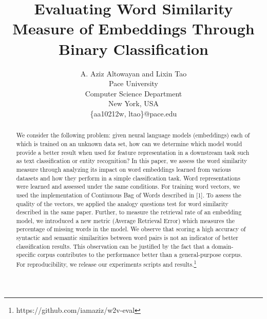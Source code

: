 \documentclass[11pt,letterpaper]{article}
\title{Evaluating Word Similarity Measure of Embeddings Through Binary
Classification}
\author{A. Aziz Altowayan and Lixin Tao\\
Pace University\\
Computer Science Department\\
New York, USA\\
{\{aa10212w, ltao\}@pace.edu}\\}
\date{}
\begin{document}
\maketitle
\begin{abstract}
We consider the following problem: given neural language models
(embeddings) each of which is trained on an unknown data set, how can we
determine which model would provide a better result when used for
feature representation in a downstream task such as text classification
or entity recognition? In this paper, we assess the word similarity
measure through analyzing its impact on word embeddings learned from
various datasets and how they perform in a simple classification task.
Word representations were learned and assessed under the same
conditions. For training word vectors, we used the implementation of
Continuous Bag of Words described in {[}1{]}. To assess the quality of
the vectors, we applied the analogy questions test for word similarity
described in the same paper. Further, to measure the retrieval rate of
an embedding model, we introduced a new metric (Average Retrieval Error)
which measures the percentage of missing words in the model. We observe
that scoring a high accuracy of syntactic and semantic similarities
between word pairs is not an indicator of better classification results.
This observation can be justified by the fact that a domain-specific
corpus contributes to the performance better than a general-purpose
corpus. For reproducibility, we release our experiments scripts and
results.\footnote{https://github.com/iamaziz/w2v-eval}
\end{abstract}

\makeatletter
\long{}
\makeatother

\makeatletter
\let\@oldmakecaption=\@makecaption
\let\oldthefigure=\thefigure
\let\oldtheHfigure=\theHfigure
\makeatother

\makeatletter
{}
\newenvironment{no-prefix-figure-caption}{
  \let\@makecaption=\@makenoprefixcaption
  \renewcommand\thefigure{x.\thefigno}
  \renewcommand\theHfigure{x.\thefigno}
  \stepcounter{figno}
}{
  \let\thefigure=\oldthefigure
  \let\theHfigure=\oldtheHfigure
  \let\@makecaption=\@oldmakecaption
  \addtocounter{figure}{-1}
}
\makeatother
\end{document}
